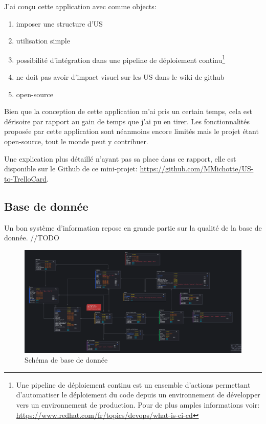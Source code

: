 \newpara

J'ai conçu cette application avec comme objects: 
\begin{enumerate}
  \item imposer une structure d'US
  \item utilisation simple
  \item possibilité d'intégration dans une pipeline de déploiement continu\footnote{Une pipeline de déploiement continu est un ensemble d'actions permettant d'automatiser le déploiement du code depuis un environnement de développer vers un environnement de production. Pour de plus amples informations voir: \url{https://www.redhat.com/fr/topics/devops/what-is-ci-cd}}
  \item ne doit pas avoir d'impact visuel sur les US dans le wiki de github
  \item open-source
\end{enumerate}

\newpara

Bien que la conception de cette application m'ai pris un certain temps, cela est dérisoire par rapport au gain de temps que j'ai pu en tirer. Les fonctionnalités proposée par cette application sont néanmoins encore limités mais le projet étant open-source, tout le monde peut y contribuer. 

\newpara

Une explication plus détaillé n'ayant pas sa place dans ce rapport, elle est disponible sur le Github de ce mini-projet: \url{https://github.com/MMichotte/US-to-TrelloCard}.


\subsection{Base de donnée}
Un bon système d'information repose en grande partie sur la qualité de la base de donnée.  
//TODO 

\begin{figure}
  \centering
  \includegraphics[width=\textwidth]{img/DB-schema.png}
  \caption{Schéma de base de donnée}
\end{figure}